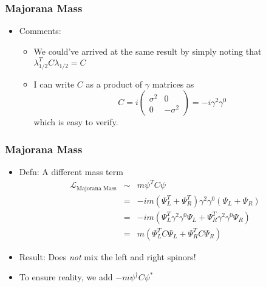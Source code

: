 \documentclass{beamer}
\begin{document}
 









 
\begin{frame}
	\frametitle{Majorana Mass}
		\begin{itemize}
		\item Comments:
		\pause
			\begin{itemize}
				\item We could've arrived at the same result by simply noting that $\lambda_{1/2}^{T}C\lambda_{1/2}=C$
				\pause
				\item I can write $C$ as a product of $\gamma$ matrices as 
				\[
				C=i\left(\begin{array}{cc}
				\sigma^{2} & 0\\
				0 & -\sigma^{2}
				\end{array}\right)=-i\gamma^{2}\gamma^{0}
				\]
				which is easy to verify.
			\end{itemize}
		\end{itemize}
\end{frame}

 









 
\begin{frame}
	\frametitle{Majorana Mass}
		\begin{itemize}

		\item Defn: A different mass term
		\pause
\[
\begin{alignedat}{2}\mathcal{L}_{\text{Majorana Mass}} & \sim & m\psi^{T}C\psi\\
 & = & -im\left(\Psi_{L}^{T}+\Psi_{R}^{T}\right)\gamma^{2}\gamma^{0}\left(\Psi_{L}+\Psi_{R}\right)\\
 & = & -im\left(\Psi_{L}^{T}\gamma^{2}\gamma^{0}\Psi_{L}+\Psi_{R}^{T}\gamma^{2}\gamma^{0}\Psi_{R}\right)\\
 & = & m\left(\Psi_{L}^{T}C\Psi_{L}+\Psi_{R}^{T}C\Psi_{R}\right)
\end{alignedat}
\]
\pause
		\item Result: Does \emph{not} mix the left and right spinors!
		\pause
		\item To ensure reality, we add $-m\psi^{\dagger}C\psi^{*}$

	\end{itemize}
\end{frame}
\end{document}
